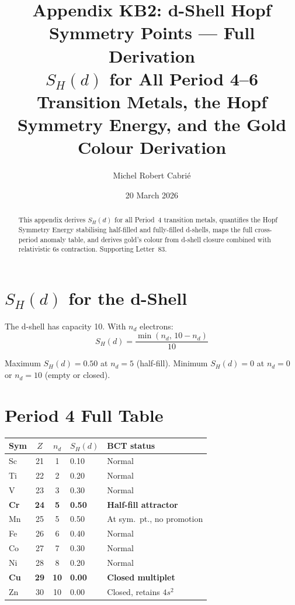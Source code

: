 \documentclass[aps,prl,twocolumn,showpacs,superscriptaddress]{revtex4-2}
\begin{document}
\title{Appendix KB2: d-Shell Hopf Symmetry Points --- Full Derivation\\
$S_H(d)$ for All Period 4--6 Transition Metals,
the Hopf Symmetry Energy, and the Gold Colour Derivation}

\author{Michel Robert Cabri\'e}
\date{20 March 2026}

\begin{abstract}
This appendix derives $S_H(d)$ for all Period~4 transition metals, 
quantifies the Hopf Symmetry Energy stabilising half-filled and 
fully-filled d-shells, maps the full cross-period anomaly table, 
and derives gold's colour from d-shell closure combined with 
relativistic 6s contraction. Supporting Letter~83.
\end{abstract}

\maketitle

\section{$S_H(d)$ for the d-Shell}

The d-shell has capacity 10. With $n_d$ electrons:
\begin{equation}
    S_H(d) = \frac{\min(n_d,\,10-n_d)}{10}
\end{equation}

Maximum $S_H(d)=0.50$ at $n_d=5$ (half-fill). 
Minimum $S_H(d)=0$ at $n_d=0$ or $n_d=10$ (empty or closed).

\section{Period 4 Full Table}

\begin{center}
\small
\begin{tabular}{lccll}
\toprule
Sym & $Z$ & $n_d$ & $S_H(d)$ & BCT status \\
\midrule
Sc & 21 & 1  & 0.10 & Normal \\
Ti & 22 & 2  & 0.20 & Normal \\
V  & 23 & 3  & 0.30 & Normal \\
\textbf{Cr} & \textbf{24} & \textbf{5}  & \textbf{0.50} & \textbf{Half-fill attractor} \\
Mn & 25 & 5  & 0.50 & At sym.~pt., no promotion \\
Fe & 26 & 6  & 0.40 & Normal \\
Co & 27 & 7  & 0.30 & Normal \\
Ni & 28 & 8  & 0.20 & Normal \\
\textbf{Cu} & \textbf{29} & \textbf{10} & \textbf{0.00} & \textbf{Closed multiplet} \\
Zn & 30 & 10 & 0.00 & Closed, retains $4s^2$ \\
\bottomrule
\end{tabular}
\end{center}
\end{document}
